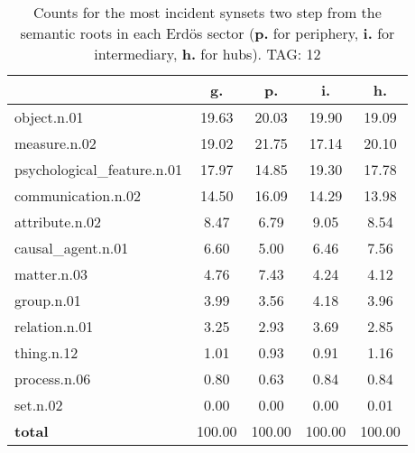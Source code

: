 \begin{table}[h!]
\begin{center}
\begin{tabular}{| l | c | c | c | c |}\hline
 & g. & p. & i. & h. \\\hline
object.n.01 & 19.63  & 20.03  & 19.90  & 19.09 \\\hline
measure.n.02 & 19.02  & 21.75  & 17.14  & 20.10 \\\hline
psychological\_feature.n.01 & 17.97  & 14.85  & 19.30  & 17.78 \\\hline
communication.n.02 & 14.50  & 16.09  & 14.29  & 13.98 \\\hline
attribute.n.02 & 8.47  & 6.79  & 9.05  & 8.54 \\\hline
causal\_agent.n.01 & 6.60  & 5.00  & 6.46  & 7.56 \\\hline
matter.n.03 & 4.76  & 7.43  & 4.24  & 4.12 \\\hline
group.n.01 & 3.99  & 3.56  & 4.18  & 3.96 \\\hline
relation.n.01 & 3.25  & 2.93  & 3.69  & 2.85 \\\hline
thing.n.12 & 1.01  & 0.93  & 0.91  & 1.16 \\\hline
process.n.06 & 0.80  & 0.63  & 0.84  & 0.84 \\\hline
set.n.02 & 0.00  & 0.00  & 0.00  & 0.01 \\\hline
{{\bf total}} & 100.00  & 100.00  & 100.00  & 100.00 \\\hline
\end{tabular}
\caption{Counts for the most incident synsets two step from the semantic roots in each Erd\"os sector ({\bf p.} for periphery, {\bf i.} for intermediary, {\bf h.} for hubs). TAG: 12}
\end{center}
\end{table}